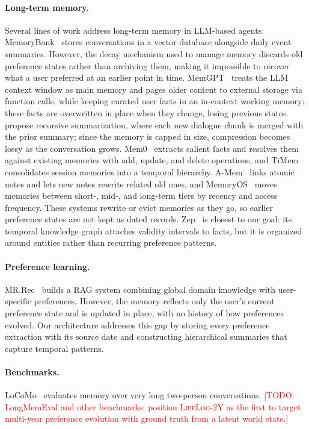 \documentclass[11pt]{article}
\newcommand{\dataset}{\textsc{LifeLog-2Y}}
\newcommand{\todo}[1]{\textcolor{red}{[TODO: #1]}}
\begin{document}
\paragraph{Long-term memory.}
Several lines of work address long-term memory in LLM-based agents. MemoryBank~\citep{zhong2023memorybank} stores conversations in a vector database alongside daily event summaries. However, the decay mechanism used to manage memory discards old preference states rather than archiving them, making it impossible to recover what a user preferred at an earlier point in time. MemGPT~\citep{packer2024memgpt} treats the LLM context window as main memory and pages older content to external storage via function calls, while keeping curated user facts in an in-context working memory; these facts are overwritten in place when they change, losing previous states. \citet{wang2024recursively} propose recursive summarization, where each new dialogue chunk is merged with the prior summary; since the memory is capped in size, compression becomes lossy as the conversation grows. Mem0~\citep{chhikara2025mem0} extracts salient facts and resolves them against existing memories with add, update, and delete operations, and TiMem~\citep{li2026timem} consolidates session memories into a temporal hierarchy. A-Mem~\citep{xu2025amem} links atomic notes and lets new notes rewrite related old ones, and MemoryOS~\citep{kang2025memoryos} moves memories between short-, mid-, and long-term tiers by recency and access frequency. These systems rewrite or evict memories as they go, so earlier preference states are not kept as dated records. Zep~\citep{rasmussen2025zep} is closest to our goal: its temporal knowledge graph attaches validity intervals to facts, but it is organized around entities rather than recurring preference patterns.

\paragraph{Preference learning.}
MR.Rec~\citep{huang2024mrrec} builds a RAG system combining global domain knowledge with user-specific preferences. However, the memory reflects only the user's current preference state and is updated in place, with no history of how preferences evolved. Our architecture addresses this gap by storing every preference extraction with its source date and constructing hierarchical summaries that capture temporal patterns.

\paragraph{Benchmarks.}
LoCoMo~\citep{maharana2024locomo} evaluates memory over very long two-person conversations. \todo{LongMemEval and other benchmarks; position \dataset{} as the first to target multi-year preference evolution with ground truth from a latent world state.}
\end{document}
